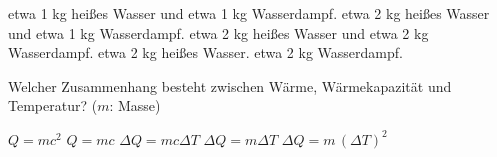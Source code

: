 \documentclass[11pt]{exam}
\begin{document}
\begin{questions}
\begin{choices}
	\choice etwa 1 kg heißes Wasser und etwa 1 kg Wasserdampf.
	\choice etwa 2 kg heißes Wasser und etwa 1 kg Wasserdampf.
	\choice etwa 2 kg heißes Wasser und etwa 2 kg Wasserdampf.
	\choice etwa 2 kg heißes Wasser.
	\choice etwa 2 kg Wasserdampf.
\end{choices}

\vspace{3mm}\question Welcher Zusammenhang besteht zwischen Wärme, Wärmekapazität und Temperatur? (\(m\): Masse)

\begin{choices}
	\choice \(Q = m c^2\)
	\choice \(Q = m c\)
	\choice \(\Delta Q = m c \Delta T\)
	\choice \(\Delta Q = m \Delta T\)
	\choice \(\Delta Q = m \, (\Delta T)^2\)
\end{choices}

\vspace{3mm}\end{questions}
\end{document}
